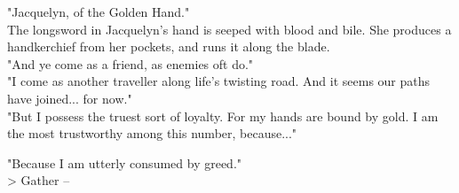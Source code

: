"Jacquelyn, of the Golden Hand."\\

The longsword in Jacquelyn's hand is seeped with blood and bile. She produces a handkerchief from her pockets, and runs it along the blade.\\

"And ye come as a friend, as enemies oft do."\\

"I come as another traveller along life's twisting road. And it seems our paths have joined... for now."\\

"But I possess the truest sort of loyalty. For my hands are bound by gold. I am the most trustworthy among this number, because..."

"Because I am utterly consumed by greed."\\

> Gather -- 